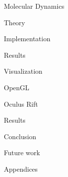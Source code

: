 \documentclass[twoside,english, a4paper, 12pt]{uiofysmaster}
\begin{document}
\begin{part}{Molecular Dynamics}
  \begin{chapter}{Theory}
  \label{chap:md}
  
  
  
  
  
  \end{chapter}

  \begin{chapter}{Implementation}
  \label{chap:md_implementation}
    
    
    
    
  \end{chapter}

  \begin{chapter}{Results}
    
    
  \end{chapter}  
\end{part}

\begin{part}{Visualization}
  
  \begin{chapter}{OpenGL}
    \label{chap:opengl}
    
    
    
    
  \end{chapter}
  
  \begin{chapter}{Oculus Rift}
    \label{chap:oculus_rift}
  \end{chapter}

  \begin{chapter}{Results}
    
  \end{chapter}
\end{part}

\begin{part}{Conclusion}
\begin{chapter}{Future work}

\end{chapter}
\end{part}
\begin{part}{Appendices}
\begin{appendices}



\end{appendices}
\end{part}
\printbibliography
\end{document}
